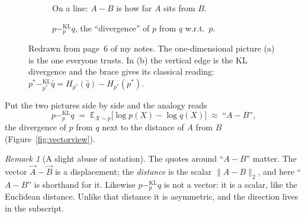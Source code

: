 \documentclass[11pt,oneside]{book}
\newcommand{\kl}[1]{\mathbin{-^{\mathrm{KL}}_{#1}}}       %
\newcommand{\E}{\mathbb{E}}
\newcommand{\pp}{{\color{pcolor}p}}
\newcommand{\qq}{{\color{qcolor}q}}
\theoremstyle{definition}
\theoremstyle{plain}
\theoremstyle{remark}
\newtheorem{remark}[definition]{Remark}
\begin{document}
\begin{figure}[t]
\centering
\begin{subfigure}[b]{0.44\textwidth}\centering
{}
\caption{On a line: $A-B$ is how far $A$ sits from $B$.}
\end{subfigure}\hfill
\begin{subfigure}[b]{0.52\textwidth}\centering
{}
\caption{$p\kl{p}q$, the ``divergence'' of $p$ from $q$ w.r.t.\ $p$.}
\end{subfigure}
\caption{Redrawn from page~6 of my notes. The one-dimensional picture (a) is the one everyone trusts. In (b)
the vertical edge is the KL divergence and the brace gives its classical reading:
$p^{*}\kl{p^{*}}\hat q=H_{p^{*}}(\hat q)-H_{p^{*}}(p^{*})$.}
\label{fig:page6}
\end{figure}

Put the two pictures side by side and the analogy reads
\begin{equation}\label{eq:analogy}
p\kl{p}q\;=\;\E_{X\sim p}\big[\log p(X)-\log q(X)\big]\;\approx\;\text{``}A-B\text{''},
\end{equation}
the divergence of $p$ from $q$ next to the distance of $A$ from $B$ (Figure~\ref{fig:vectorview}).

\begin{remark}[A slight abuse of notation]
The quotes around ``$A-B$'' matter. The vector $\vec{A}-\vec{B}$ is a displacement; the \emph{distance} is the
scalar $\lVert A-B\rVert_2$, and here ``$A-B$'' is shorthand for it. Likewise $p\kl{p}q$ is not a vector: it is a
scalar, like the Euclidean distance. Unlike that distance it is asymmetric, and the direction lives in the
subscript.
\end{remark}
\end{document}
